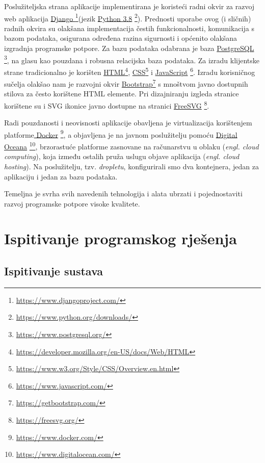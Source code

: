 			Poslužiteljska strana aplikacije implementirana je koristeći radni okvir za razvoj web aplikacija \underline{Django } \footnote {\url{https://www.djangoproject.com/}}(jezik \underline{Python 3.8} \footnote {\url{https://www.python.org/downloads/}}). Prednosti uporabe ovog (i sličnih) radnih okvira su olakšana implementacija čestih funkcionalnosti, komunikacija s bazom podataka, osigurana određena razina sigurnosti i općenito olakšana izgradnja programske potpore. Za bazu podataka odabrana je baza \underline{PostgreSQL }\footnote {\url{https://www.postgresql.org/}},  na glasu kao pouzdana i robusna relacijska baza podataka.
			Za izradu klijentske strane tradicionalno je korišten \underline{HTML}\footnote {\url{https://developer.mozilla.org/en-US/docs/Web/HTML}}, \underline{CSS}\footnote {\url{https://www.w3.org/Style/CSS/Overview.en.html}} i \underline{JavaScript} \footnote {\url{	https://www.javascript.com/}}. Izradu korisničnog sučelja olakšao nam je razvojni okvir \underline{Bootstrap}\footnote {\url{https://getbootstrap.com/}} s mnoštvom javno dostupnih stilova za često korištene HTML elemente. Pri dizajniranju izgleda stranice korištene su i SVG ikonice javno dostupne na stranici \underline{FreeSVG} \footnote {\url{https://freesvg.org/}}. 
		
			Radi pouzdanosti i neovisnosti aplikacije obavljena je virtualizacija korištenjem platforme\underline{ Docker} \footnote {\url{https://www.docker.com/}}, a objavljena je na javnom poslužitelju pomoću \underline{Digital Oceana} \footnote {\url{https://www.digitalocean.com/}}, brzorastuće platforme zasnovane na računarstvu u oblaku (\textit{engl. cloud computing}), koja između ostalih pruža uslugu objave aplikacija (\textit{engl. cloud hosting}). Na poslužitelju, tzv. \textit {dropletu}, konfigurirali smo dva kontejnera, jedan za aplikaciju i jedan za bazu podataka. \newline

		
			
			Temeljna je svrha svih navedenih tehnologija i alata ubrzati i pojednostaviti razvoj programske potpore visoke kvalitete.
					
			\eject 
		
	
		\section{Ispitivanje programskog rješenja}
			
		\subsection{Ispitivanje sustava}
			
